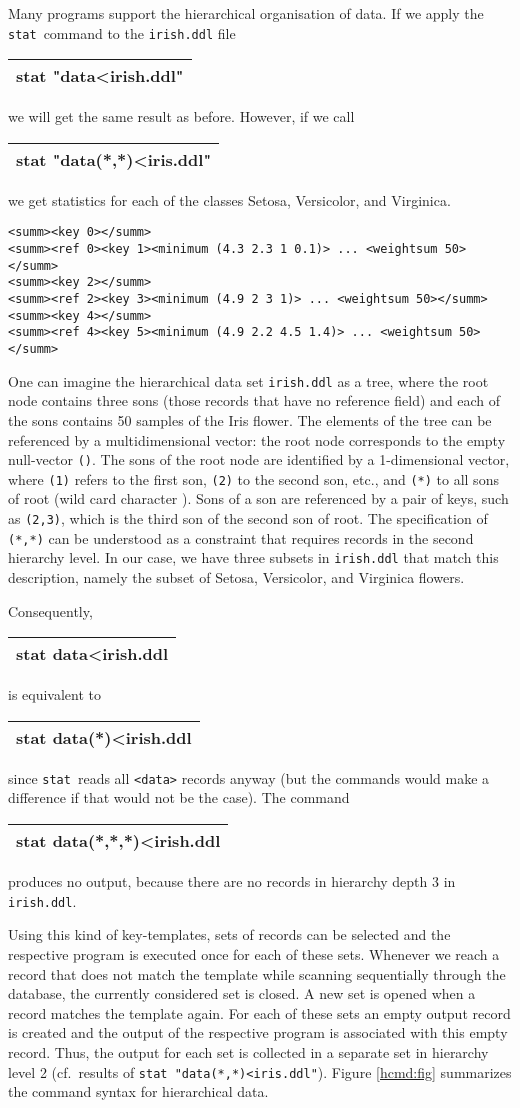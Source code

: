 \documentclass[a4paper]{book}
\newcommand{\cmd}[1]{%
{\vspace{-2mm}\tt\begin{center}\begin{tabular}{||l||}%
\hline%
#1\\%
\hline%
\end{tabular}\end{center}}\vspace{-2mm}}
\newcommand{\printprogram}[1]{{\tt #1}\index{#1}}
\newcommand{\pstat}{\printprogram{stat}}
\begin{document}
Many programs support the hierarchical organisation of data. If we
apply the \pstat\ command to the {\tt irish.ddl} file \cmd{stat
"data<irish.ddl"} we will get the same result as before. However, if
we call \cmd{stat "data(*,*)<iris.ddl"} we get statistics for
each of the classes Setosa, Versicolor, and Virginica.
\begin{verbatim}
<summ><key 0></summ>
<summ><ref 0><key 1><minimum (4.3 2.3 1 0.1)> ... <weightsum 50></summ>
<summ><key 2></summ>
<summ><ref 2><key 3><minimum (4.9 2 3 1)> ... <weightsum 50></summ>
<summ><key 4></summ>
<summ><ref 4><key 5><minimum (4.9 2.2 4.5 1.4)> ... <weightsum 50></summ>
\end{verbatim}

One can imagine the hierarchical data set {\tt irish.ddl} as a tree,
where the root node contains three sons (those records that have no
reference field) and each of the sons contains 50 samples of the Iris
flower. The elements of the tree can be referenced by a
multidimensional vector: the root node corresponds to the empty
null-vector \verb+()+. The sons of the root node are identified by a
1-dimensional vector, where \verb+(1)+ refers to the first son,
\verb+(2)+ to the second son, etc., and \verb+(*)+ to all sons of root
(wild card character {\tt *}). Sons of a son are referenced by a pair
of keys, such as \verb+(2,3)+, which is the third son of the second
son of root. The specification of {\tt (*,*)} can be understood as a
constraint that requires records in the second hierarchy
level. In our case, we have three subsets in {\tt irish.ddl} that
match this description, namely the subset of Setosa, Versicolor, and
Virginica flowers.

Consequently, \cmd{stat data<irish.ddl} is equivalent to \cmd{stat
data(*)<irish.ddl} since \pstat\ reads all {\tt <data>} records anyway
(but the commands would make a difference if that would not be the
case). The command \cmd{stat data(*,*,*)<irish.ddl} produces no
output, because there are no records in hierarchy depth 3 in {\tt
irish.ddl}. 

Using this kind of key-templates, sets of records can be selected and
the respective program is executed once for each of these
sets. Whenever we reach a record that does not match the template
while scanning sequentially through the database, the currently
considered set is closed. A new set is opened when a record matches
the template again. For each of these sets an empty output record is
created and the output of the respective program is associated with
this empty record. Thus, the output for each set is collected in a
separate set in hierarchy level 2 (cf.\ results of {\tt stat
"data(*,*)<iris.ddl"}). Figure \ref{hcmd:fig} summarizes the command syntax for
hierarchical data.
\end{document}
